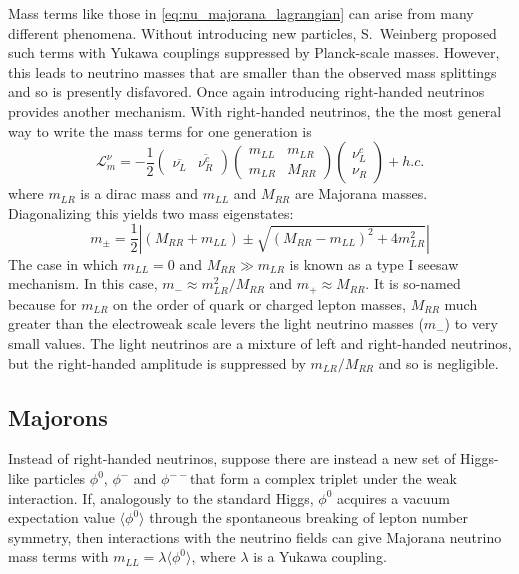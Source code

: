 \documentclass[herrin-thesis.tex]{subfiles}
\begin{document}
Mass terms like those in \cref{eq:nu_majorana_lagrangian} can arise from many different phenomena. Without introducing new particles, S.~Weinberg\cite{Weinberg:1979qa} proposed such terms with Yukawa couplings suppressed by Planck-scale masses. However, this leads to neutrino masses that are smaller than the observed mass splittings and so is presently disfavored. Once again introducing right-handed neutrinos provides another mechanism. With right-handed neutrinos, the the most general way to write the mass terms for one generation is 
\begin{equation}
\mathcal{L}_{m}^{\nu} = -\frac{1}{2}
\begin{pmatrix}
	\overline{\nu_{L}} 	&	\overline{\nu_{R}^{c}}
\end{pmatrix}
\begin{pmatrix}
	m_{L L} 		&	m_{L R}			\\
	m_{L R}		&	M_{R R}
\end{pmatrix}
\begin{pmatrix}
	\nu_{L}^{c}	\\
	\nu_{R}
\end{pmatrix} + h.c.
\label{eq:nu_mass_matrix}
\end{equation}
where \(m_{L R}\) is a dirac mass and \(m_{L L}\) and \(M_{R R}\) are Majorana masses. Diagonalizing this yields two mass eigenstates:
\begin{equation}
m_{\pm} = \frac{1}{2}\left | (M_{R R} + m_{L L}) \pm \sqrt{\left(M_{R R} - m_{L L}\right)^2 + 4 m_{L R}^2}\right |
\label{eq:nu_diagonalized_masses}
\end{equation}
The case in which \(m_{L L} = 0\) and \(M_{R R}\gg m_{L R}\) is known as a type I seesaw mechanism. In this case, \(m_{-} \approx m_{L R}^2/M_{R R}\) and \(m_{+} \approx M_{R R}\). It is so-named because for \(m_{L R}\) on the order of quark or charged lepton masses, \(M_{R R}\) much greater than the electroweak scale levers the light neutrino masses (\(m_{-}\)) to very small values. The light neutrinos are a mixture of left and right-handed neutrinos, but the right-handed amplitude is suppressed by \(m_{L R}/M_{R R}\) and so is negligible.

\subsection{Majorons}
Instead of right-handed neutrinos, suppose there are instead a new set of Higgs-like particles \(\phi^0\), \(\phi^{-}\) and \(\phi^{--}\)that form a complex triplet under the weak interaction. If, analogously to the standard Higgs, \(\phi^0\) acquires a vacuum expectation value \(\langle\phi^0\rangle\) through the spontaneous breaking of lepton number symmetry, then interactions with the neutrino fields can give Majorana neutrino mass terms with \(m_{L L} = \lambda \langle\phi^0\rangle\), where \(\lambda\) is a Yukawa coupling.
\end{document}
